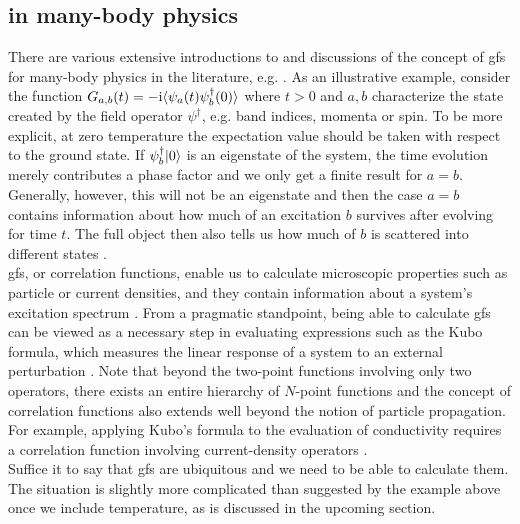 \subsection{\texorpdfstring{}{GF} in many-body physics}\label{sec:gf:motivation}
There are various extensive introductions to and discussions of the concept of \glspl{gf} for many-body physics in the literature, e.g. \cite{QFT_Abrikosov_1975,QMB_Mahan_2000,QMB_Bruus_2004,QMB_Fabrizio_2022}. %
As an illustrative example, consider the function $\sgf_{a,b}(t)=-\i \bra{\psi_a(t) \psi_b^\dagger(0)}$ where $t>0$ and $a,b$ characterize the state created by the field operator $\psi^\dagger$, e.g. band indices, momenta or spin.
To be more explicit, at zero temperature the expectation value should be taken with respect to the ground state.
If $\psi_b^\dagger \Ket{0}$ is an eigenstate of the system, the time evolution merely contributes a phase factor and we only get a finite result for $a=b$.
Generally, however, this will not be an eigenstate and then the case $a=b$ contains information about how much of an excitation $b$ survives after evolving for time $t$.
The full object then also tells us how much of $b$ is scattered into different states \cite[]{QMB_Mahan_2000}.\\
\glspl{gf}, or correlation functions, enable us to calculate microscopic properties such as particle or current densities, and they contain information about a system's excitation spectrum \cite[]{QFT_Abrikosov_1975}.
From a pragmatic standpoint, being able to calculate \glspl{gf} can be viewed as a necessary step in evaluating expressions such as the Kubo formula, which measures the linear response of a system to an external perturbation \cite{QMB_Mahan_2000,QMB_Bruus_2004}.
Note that beyond the two-point functions involving only two operators, there exists an entire hierarchy of $N$-point functions \cite{AltlandSimons} and the concept of correlation functions also extends well beyond the notion of particle propagation.
For example, applying Kubo's formula to the evaluation of conductivity requires a correlation function involving current-density operators \cite{QMB_Coleman_2015}.\\
Suffice it to say that \glspl{gf} are ubiquitous and we need to be able to calculate them.
The situation is slightly more complicated than suggested by the example above once we include temperature, as is discussed in the upcoming section.
